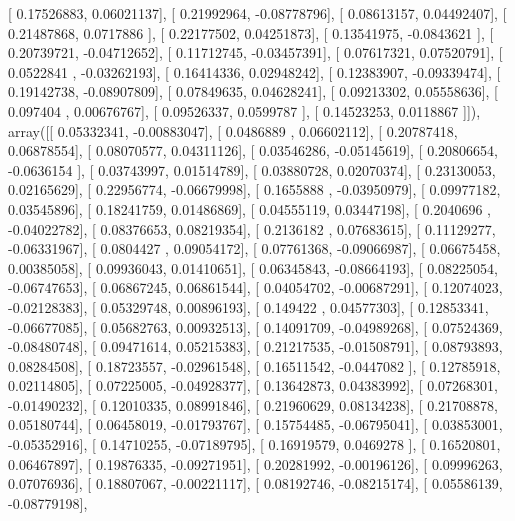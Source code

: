 \documentclass{article}
\begin{document}
       [ 0.17526883,  0.06021137],
       [ 0.21992964, -0.08778796],
       [ 0.08613157,  0.04492407],
       [ 0.21487868,  0.0717886 ],
       [ 0.22177502,  0.04251873],
       [ 0.13541975, -0.0843621 ],
       [ 0.20739721, -0.04712652],
       [ 0.11712745, -0.03457391],
       [ 0.07617321,  0.07520791],
       [ 0.0522841 , -0.03262193],
       [ 0.16414336,  0.02948242],
       [ 0.12383907, -0.09339474],
       [ 0.19142738, -0.08907809],
       [ 0.07849635,  0.04628241],
       [ 0.09213302,  0.05558636],
       [ 0.097404  ,  0.00676767],
       [ 0.09526337,  0.0599787 ],
       [ 0.14523253,  0.0118867 ]]), array([[ 0.05332341, -0.00883047],
       [ 0.0486889 ,  0.06602112],
       [ 0.20787418,  0.06878554],
       [ 0.08070577,  0.04311126],
       [ 0.03546286, -0.05145619],
       [ 0.20806654, -0.0636154 ],
       [ 0.03743997,  0.01514789],
       [ 0.03880728,  0.02070374],
       [ 0.23130053,  0.02165629],
       [ 0.22956774, -0.06679998],
       [ 0.1655888 , -0.03950979],
       [ 0.09977182,  0.03545896],
       [ 0.18241759,  0.01486869],
       [ 0.04555119,  0.03447198],
       [ 0.2040696 , -0.04022782],
       [ 0.08376653,  0.08219354],
       [ 0.2136182 ,  0.07683615],
       [ 0.11129277, -0.06331967],
       [ 0.0804427 ,  0.09054172],
       [ 0.07761368, -0.09066987],
       [ 0.06675458,  0.00385058],
       [ 0.09936043,  0.01410651],
       [ 0.06345843, -0.08664193],
       [ 0.08225054, -0.06747653],
       [ 0.06867245,  0.06861544],
       [ 0.04054702, -0.00687291],
       [ 0.12074023, -0.02128383],
       [ 0.05329748,  0.00896193],
       [ 0.149422  ,  0.04577303],
       [ 0.12853341, -0.06677085],
       [ 0.05682763,  0.00932513],
       [ 0.14091709, -0.04989268],
       [ 0.07524369, -0.08480748],
       [ 0.09471614,  0.05215383],
       [ 0.21217535, -0.01508791],
       [ 0.08793893,  0.08284508],
       [ 0.18723557, -0.02961548],
       [ 0.16511542, -0.0447082 ],
       [ 0.12785918,  0.02114805],
       [ 0.07225005, -0.04928377],
       [ 0.13642873,  0.04383992],
       [ 0.07268301, -0.01490232],
       [ 0.12010335,  0.08991846],
       [ 0.21960629,  0.08134238],
       [ 0.21708878,  0.05180744],
       [ 0.06458019, -0.01793767],
       [ 0.15754485, -0.06795041],
       [ 0.03853001, -0.05352916],
       [ 0.14710255, -0.07189795],
       [ 0.16919579,  0.0469278 ],
       [ 0.16520801,  0.06467897],
       [ 0.19876335, -0.09271951],
       [ 0.20281992, -0.00196126],
       [ 0.09996263,  0.07076936],
       [ 0.18807067, -0.00221117],
       [ 0.08192746, -0.08215174],
       [ 0.05586139, -0.08779198],
\end{document}
